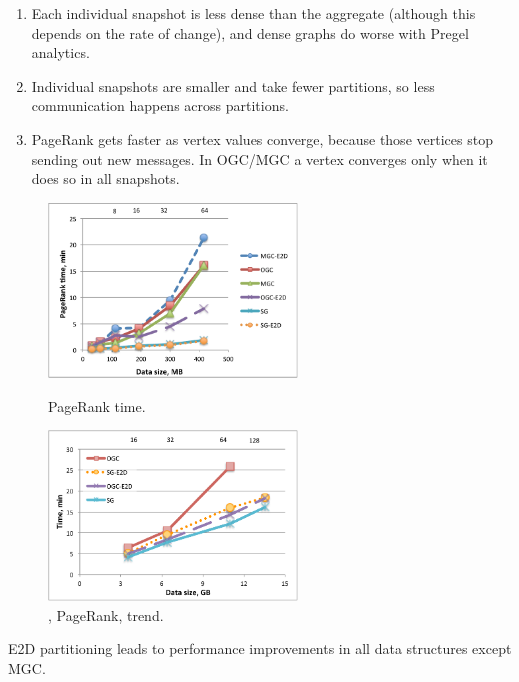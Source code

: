 \begin{enumerate}[leftmargin=*]
\item Each individual snapshot is less dense than the aggregate
  (although this depends on the rate of change), and dense graphs do
  worse with Pregel analytics.
\item Individual snapshots are smaller and take fewer partitions, so
  less communication happens across partitions.
\item PageRank gets faster as vertex values converge, because those
  vertices stop sending out new messages.  In OGC/MGC a vertex converges
  only when it does so in all snapshots.
\end{enumerate}

\begin{figure}[t]
\centering
\begin{minipage}{3in}
  \centering
  \includegraphics[width=2.6in]{figs/pagerank.pdf}
  \vspace{-0.1in}
  \caption{PageRank time.}
  \label{fig:pagerank}
  \vspace{-0.1in}
\end{minipage}
\begin{minipage}{3in}
  \centering
\includegraphics[width=2.6in]{figs/complexq.pdf}
  \vspace{-0.1in}
\caption{, PageRank, trend.}
\label{fig:complexq}
  \vspace{-0.1in}
\end{minipage}
\end{figure}

E2D partitioning leads to performance improvements in all data
structures except MGC.


